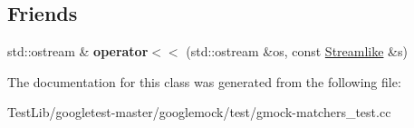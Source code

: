 \subsection*{Friends}
\begin{DoxyCompactItemize}
\item 
\mbox{\label{classtesting_1_1gmock__matchers__test_1_1Streamlike_a4b45ba8c2a5ee61697003f02568df91f}} 
std\+::ostream \& {\bfseries operator$<$$<$} (std\+::ostream \&os, const \hyperlink{classtesting_1_1gmock__matchers__test_1_1Streamlike}{Streamlike} \&s)
\end{DoxyCompactItemize}


The documentation for this class was generated from the following file\+:\begin{DoxyCompactItemize}
\item 
Test\+Lib/googletest-\/master/googlemock/test/gmock-\/matchers\+\_\+test.\+cc\end{DoxyCompactItemize}
